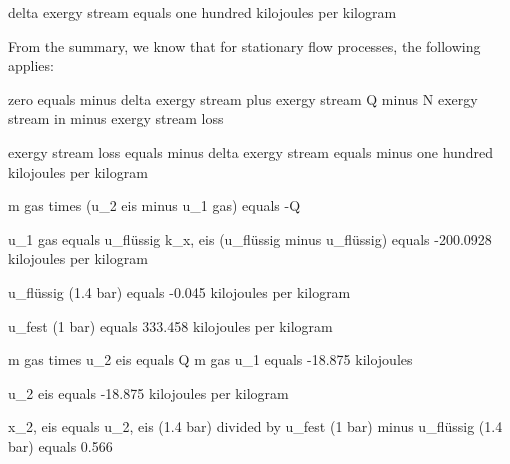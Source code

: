 delta exergy stream equals one hundred kilojoules per kilogram

From the summary, we know that for stationary flow processes, the following applies:

zero equals minus delta exergy stream plus exergy stream Q minus N exergy stream in minus exergy stream loss

exergy stream loss equals minus delta exergy stream equals minus one hundred kilojoules per kilogram

m gas times (u_2 eis minus u_1 gas) equals -Q

u_1 gas equals u_flüssig k_x, eis (u_flüssig minus u_flüssig) equals -200.0928 kilojoules per kilogram

u_flüssig (1.4 bar) equals -0.045 kilojoules per kilogram

u_fest (1 bar) equals 333.458 kilojoules per kilogram

m gas times u_2 eis equals Q m gas u_1 equals -18.875 kilojoules

u_2 eis equals -18.875 kilojoules per kilogram

x_2, eis equals u_2, eis (1.4 bar) divided by u_fest (1 bar) minus u_flüssig (1.4 bar) equals 0.566